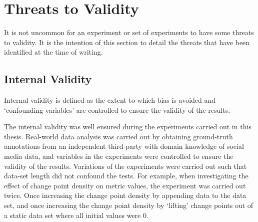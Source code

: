 \documentclass[../main.tex]{subfiles}
\begin{document}

\section{Threats to Validity}
\label{threats}

It is not uncommon for an experiment or set of experiments to have some threats to validity. It is the intention of this section to detail the threats that have been identified at the time of writing.

\subsection{Internal Validity}

Internal validity is defined as the extent to which bias is avoided and `confounding variables' are controlled to ensure the validity of the results.

The internal validity was well ensured during the experiments carried out in this thesis. Real-world data analysis was carried out by obtaining ground-truth annotations from an independent third-party with domain knowledge of social media data, and variables in the experiments were controlled to ensure the validity of the results. Variations of the experiments were carried out such that data-set length did not confound the tests. For example, when investigating the effect of change point density on metric values, the experiment was carried out twice. Once increasing the change point density by appending data to the data set, and once increasing the change point density by `lifting' change points out of a static data set where all initial values were $0$. 
\end{document}
